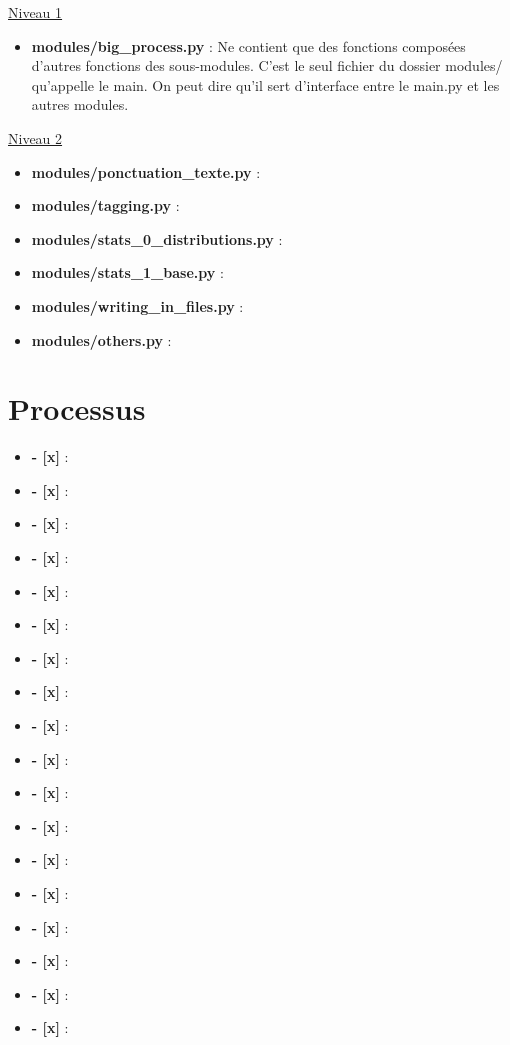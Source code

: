 \underline{Niveau 1}
	\begin{itemize}
	\item \textbf{modules/big\_process.py} : Ne contient que des fonctions composées d'autres fonctions des sous-modules. C'est le seul fichier du dossier modules/ qu'appelle le main. On peut dire qu'il sert d'interface entre le main.py et les autres modules.
	
	\end{itemize}

\underline{Niveau 2}
	\begin{itemize}
	\item \textbf{modules/ponctuation\_texte.py} : 
	
	\item \textbf{modules/tagging.py} :
	
	\item \textbf{modules/stats\_0\_distributions.py} :
	
	\item \textbf{modules/stats\_1\_base.py} :
	
	\item \textbf{modules/writing\_in\_files.py} :

	\item \textbf{modules/others.py} :
	\end{itemize}

\newpage
\section{Processus}

\begin{itemize}
\item \textbf{- [x]} : 
\item \textbf{- [x]} : 
\item \textbf{- [x]} : 
\item \textbf{- [x]} : 
\item \textbf{- [x]} : 
\item \textbf{- [x]} : 
\item \textbf{- [x]} : 
\item \textbf{- [x]} : 
\item \textbf{- [x]} : 
\item \textbf{- [x]} : 
\item \textbf{- [x]} : 
\item \textbf{- [x]} : 
\item \textbf{- [x]} : 
\item \textbf{- [x]} : 
\item \textbf{- [x]} : 
\item \textbf{- [x]} : 
\item \textbf{- [x]} : 
\item \textbf{- [x]} : 
\end{itemize}








